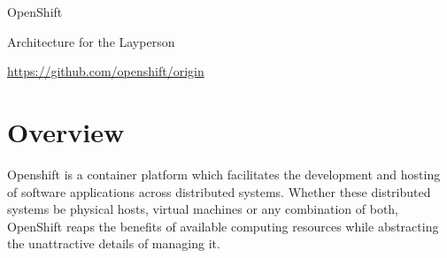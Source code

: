 \documentclass{article}
\begin{document}
\centerline{\sc \large OpenShift}
\centerline{\sc Architecture for the Layperson }
\centerline{\url{https://github.com/openshift/origin}}

\vspace{1pc}

\section{Overview}
\hspace{3pc} Openshift is a container platform which facilitates the development and hosting of software applications across
distributed systems. Whether these distributed systems be physical hosts, virtual machines or any combination of 
both, OpenShift reaps the benefits of available computing resources while abstracting the unattractive details 
of managing it. 
\end{document}
